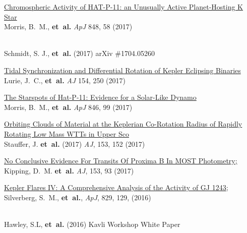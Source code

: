 \begin{etaremune}[leftmargin=10pt]
\item{\sc \href{https://arxiv.org/abs/1709.03913}{\color{NavyBlue} Chromospheric Activity of HAT-P-11: an Unusually Active Planet-Hosting K Star}}\\
Morris, B.~M., {\bf et~al.} {\em ApJ} 848, 58 (2017)

\item\href{https://arxiv.org/abs/1704.05260}{\color{NavyBlue}{\sc The Role of Gender in Asking Questions at Cool Stars 18 and 19}}\\ 
Schmidt, S. J., {\bf et~al.} (2017) arXiv \#1704.05260

\item{\sc \href{https://arxiv.org/abs/1710.07339}{\color{NavyBlue}Tidal Synchronization and Differential Rotation of Kepler Eclipsing Binaries}}\\ Lurie, J.~C., {\bf et~al.} {\em AJ} 154, 250 (2017)

\item{\sc \href{https://arxiv.org/abs/1708.02583}{\color{NavyBlue}The Starspots of Hat-P-11: Evidence for a Solar-Like Dynamo}} \\ Morris, B.~M., {\bf et~al.} {\em ApJ} 846, 99 (2017)

\item{\sc \href{https://arxiv.org/abs/1702.01797}{\color{NavyBlue}Orbiting Clouds of Material at the Keplerian Co-Rotation Radius of Rapidly Rotating Low Mass WTTs in Upper Sco}} \\
Stauffer, J. {\bf et~al.} (2017) {\em AJ}, 153, 152 (2017)

\item{\sc \href{http://arxiv.org/abs/1609.08718}{\color{NavyBlue}No Conclusive Evidence For Transits Of Proxima B In MOST Photometry;}} \\  Kipping, D.~M. {\bf et~al.} {\em AJ}, 153, 93 (2017)

\item{\sc \href{http://arxiv.org/abs/1607.03886}{\color{NavyBlue}Kepler Flares IV: A Comprehensive Analysis of the Activity of GJ 1243}};\\ Silverberg, S.~M., {\bf et~al.}, {\em ApJ}, 829, 129, (2016)

\item{\sc\href{http://arxiv.org/abs/1607.04302}{\color{NavyBlue}{\sc Maximizing Science in the Era of LSST, Stars Study Group Report: Rotation and \\Magnetic Activity in the Galactic Field Population and in Open Star Clusters}}}\\
Hawley, S.L, {\bf et~al.} (2016) Kavli Workshop White Paper


\end{etaremune}
